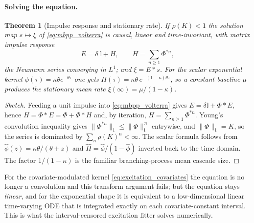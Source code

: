 \documentclass[11pt]{article}
\theoremstyle{plain}
\newtheorem{theorem}[proposition]{Theorem}
\theoremstyle{definition}
\theoremstyle{remark}
\begin{document}
\paragraph{Solving the equation.}
\begin{theorem}[Impulse response and stationary rate]
\label{thm:impulse}
If $\rho(K)<1$ the solution map $s\mapsto\xi$ of \eqref{eq:mbpp_volterra} is causal, linear and time-invariant, with matrix impulse response
\[
E=\delta\,\mathbb{I}+H,\qquad H=\sum_{n\ge1}\Phi^{\ast n},
\]
the Neumann series converging in $L^1$; and $\xi=E\ast s$. For the scalar exponential kernel $\phi(\tau)=\kappa\theta e^{-\theta\tau}$ one gets $H(\tau)=\kappa\theta\,e^{-(1-\kappa)\theta\tau}$, so a constant baseline $\mu$ produces the stationary mean rate $\xi(\infty)=\mu/(1-\kappa)$.
\end{theorem}
\begin{proof}[Sketch]
Feeding a unit impulse into \eqref{eq:mbpp_volterra} gives $E=\delta\mathbb{I}+\Phi\ast E$, hence $H=\Phi\ast E=\Phi+\Phi\ast H$ and, by iteration, $H=\sum_{n\ge1}\Phi^{\ast n}$. Young's convolution inequality gives $\|\Phi^{\ast n}\|_1\le\|\Phi\|_1^{\,n}$ entrywise, and $\|\Phi\|_1=K$, so the series is dominated by $\sum_n\rho(K)^n<\infty$. The scalar formula follows from $\widehat\phi(z)=\kappa\theta/(\theta+z)$ and $\widehat H=\widehat\phi/(1-\widehat\phi)$ inverted back to the time domain. The factor $1/(1-\kappa)$ is the familiar branching-process mean cascade size.
\end{proof}
For the covariate-modulated kernel \eqref{eq:excitation_covariates} the equation is no longer a convolution and this transform argument fails; but the equation stays \emph{linear}, and for the exponential shape it is equivalent to a low-dimensional linear time-varying ODE that is integrated exactly on each covariate-constant interval. This is what the interval-censored excitation fitter solves numerically.
\end{document}
